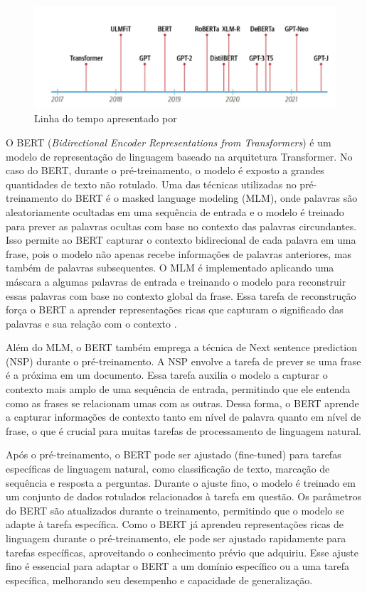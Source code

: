 \begin{figure}[H]
   \centering
   \includegraphics[width=0.8\linewidth]{capitulos/figuras/transformadoras.jpg}
   \caption{Linha do tempo apresentado por  \textcite{Tunstall2022-uq}}
   \label{fig:linhatransformer}
\end{figure}


O BERT (\textit{Bidirectional Encoder Representations from Transformers}) é um modelo de representação de linguagem baseado na arquitetura Transformer. No caso do BERT, durante o pré-treinamento, o modelo é exposto a grandes quantidades de texto não rotulado. Uma das técnicas utilizadas no pré-treinamento do BERT é o masked language modeling (MLM), onde palavras são aleatoriamente ocultadas em uma sequência de entrada e o modelo é treinado para prever as palavras ocultas com base no contexto das palavras circundantes. Isso permite ao BERT capturar o contexto bidirecional de cada palavra em uma frase, pois o modelo não apenas recebe informações de palavras anteriores, mas também de palavras subsequentes. O MLM é implementado aplicando uma máscara a algumas palavras de entrada e treinando o modelo para reconstruir essas palavras com base no contexto global da frase. Essa tarefa de reconstrução força o BERT a aprender representações ricas que capturam o significado das palavras e sua relação com o contexto \cite{Develin}.

Além do MLM, o BERT também emprega a técnica de Next sentence prediction (NSP) durante o pré-treinamento. A NSP envolve a tarefa de prever se uma frase é a próxima em um documento. Essa tarefa auxilia o modelo a capturar o contexto mais amplo de uma sequência de entrada, permitindo que ele entenda como as frases se relacionam umas com as outras. Dessa forma, o BERT aprende a capturar informações de contexto tanto em nível de palavra quanto em nível de frase, o que é crucial para muitas tarefas de processamento de linguagem natural.

Após o pré-treinamento, o BERT pode ser ajustado (fine-tuned) para tarefas específicas de linguagem natural, como classificação de texto, marcação de sequência e resposta a perguntas. Durante o ajuste fino, o modelo é treinado em um conjunto de dados rotulados relacionados à tarefa em questão. Os parâmetros do BERT são atualizados durante o treinamento, permitindo que o modelo se adapte à tarefa específica. Como o BERT já aprendeu representações ricas de linguagem durante o pré-treinamento, ele pode ser ajustado rapidamente para tarefas específicas, aproveitando o conhecimento prévio que adquiriu. Esse ajuste fino é essencial para adaptar o BERT a um domínio específico ou a uma tarefa específica, melhorando seu desempenho e capacidade de generalização.

